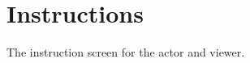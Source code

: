 \section{Instructions}
\begin{figure}[h!]
\end{figure}
The instruction screen for the actor and viewer.

\newpage

